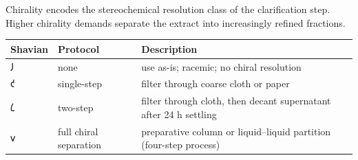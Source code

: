 Chirality encodes the stereochemical resolution class of the
clarification step. Higher chirality demands separate the extract into
increasingly refined fractions.

\begin{longtable}[]{@{}lll@{}}
\toprule
\begin{minipage}[b]{0.30\columnwidth}\raggedright
Shavian\strut
\end{minipage} & \begin{minipage}[b]{0.30\columnwidth}\raggedright
Protocol\strut
\end{minipage} & \begin{minipage}[b]{0.30\columnwidth}\raggedright
Description\strut
\end{minipage}\tabularnewline
\midrule
\endhead
\begin{minipage}[t]{0.30\columnwidth}\raggedright
𐑓\strut
\end{minipage} & \begin{minipage}[t]{0.30\columnwidth}\raggedright
none\strut
\end{minipage} & \begin{minipage}[t]{0.30\columnwidth}\raggedright
use as-is; racemic; no chiral resolution\strut
\end{minipage}\tabularnewline
\begin{minipage}[t]{0.30\columnwidth}\raggedright
𐑒\strut
\end{minipage} & \begin{minipage}[t]{0.30\columnwidth}\raggedright
single-step\strut
\end{minipage} & \begin{minipage}[t]{0.30\columnwidth}\raggedright
filter through coarse cloth or paper\strut
\end{minipage}\tabularnewline
\begin{minipage}[t]{0.30\columnwidth}\raggedright
𐑖\strut
\end{minipage} & \begin{minipage}[t]{0.30\columnwidth}\raggedright
two-step\strut
\end{minipage} & \begin{minipage}[t]{0.30\columnwidth}\raggedright
filter through cloth, then decant supernatant after 24 h settling\strut
\end{minipage}\tabularnewline
\begin{minipage}[t]{0.30\columnwidth}\raggedright
𐑫\strut
\end{minipage} & \begin{minipage}[t]{0.30\columnwidth}\raggedright
full chiral separation\strut
\end{minipage} & \begin{minipage}[t]{0.30\columnwidth}\raggedright
preparative column or liquid--liquid partition (four-step process)\strut
\end{minipage}\tabularnewline
\bottomrule
\end{longtable}

